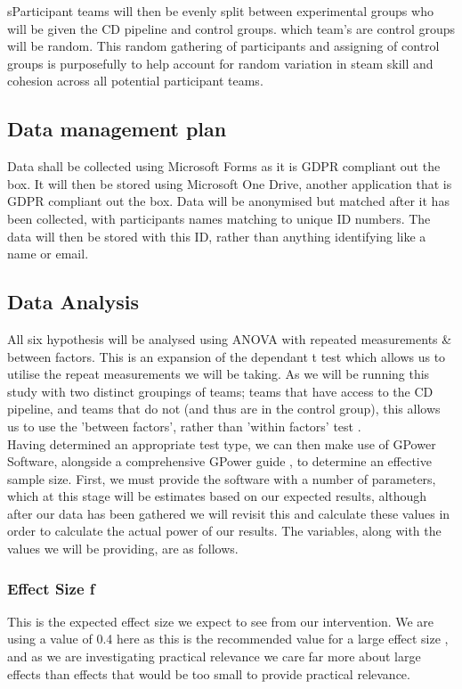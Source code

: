 \documentclass[lettersize,journal]{IEEEtran}
\begin{document}
        sParticipant teams will then be evenly split between experimental groups who will be given the CD pipeline and control groups. which team's are control groups will be random. This random gathering of participants and assigning of control groups is purposefully to help account for random variation in steam skill and cohesion across all potential participant teams.
        
        \subsection{Data management plan}
        Data shall be collected using Microsoft Forms as it is GDPR compliant out the box. It will then be stored using Microsoft One Drive, another application that is GDPR compliant out the box.
        Data will be anonymised but matched after it has been collected, with participants names matching to unique ID numbers. The data will then be stored with this ID, rather than anything identifying like a name or email.
    
    \subsection{Data Analysis}
        All six hypothesis will be analysed using ANOVA with repeated measurements \& between factors. This is an expansion of the dependant t test \cite{carvadiaANOVA} which allows us to utilise the repeat measurements we will be taking. As we will be running this study with two distinct groupings of teams; teams that have access to the CD pipeline, and teams that do not (and thus are in the control group), this allows us to use the 'between factors', rather than 'within factors' test \cite{carvadiaANOVA}. \\
        Having determined an appropriate test type, we can then make use of GPower Software\cite{faul2007g,faul2009statistical}, alongside a comprehensive GPower guide \cite{gpowerguide}, to determine an effective sample size. First, we must provide the software with a number of parameters, which at this stage will be estimates based on our expected results, although after our data has been gathered we will revisit this and calculate these values in order to calculate the actual power of our results. The variables, along with the values we will be providing, are as follows.

        \subsubsection*{Effect Size f}
            This is the expected effect size we expect to see from our intervention. We are using a value of 0.4 here as this is the recommended value for a large effect size \cite{cohen1992power}, and as we are investigating practical relevance we care far more about large effects than effects that would be too small to provide practical relevance.\\
\end{document}
